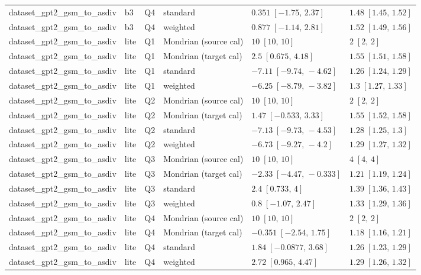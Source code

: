 \begin{longtable}{@{}p{}p{}p{}p{}p{}p{}@{}}
dataset\_gpt2\_gsm\_to\_asdiv & b3 & Q4 & standard & $0.351\;[-1.75,\,2.37]$ & $1.48\;[1.45,\,1.52]$ \\
dataset\_gpt2\_gsm\_to\_asdiv & b3 & Q4 & weighted & $0.877\;[-1.14,\,2.81]$ & $1.52\;[1.49,\,1.56]$ \\
dataset\_gpt2\_gsm\_to\_asdiv & lite & Q1 & Mondrian (source cal) & $10\;[10,\,10]$ & $2\;[2,\,2]$ \\
dataset\_gpt2\_gsm\_to\_asdiv & lite & Q1 & Mondrian (target cal) & $2.5\;[0.675,\,4.18]$ & $1.55\;[1.51,\,1.58]$ \\
dataset\_gpt2\_gsm\_to\_asdiv & lite & Q1 & standard & $-7.11\;[-9.74,\,-4.62]$ & $1.26\;[1.24,\,1.29]$ \\
dataset\_gpt2\_gsm\_to\_asdiv & lite & Q1 & weighted & $-6.25\;[-8.79,\,-3.82]$ & $1.3\;[1.27,\,1.33]$ \\
dataset\_gpt2\_gsm\_to\_asdiv & lite & Q2 & Mondrian (source cal) & $10\;[10,\,10]$ & $2\;[2,\,2]$ \\
dataset\_gpt2\_gsm\_to\_asdiv & lite & Q2 & Mondrian (target cal) & $1.47\;[-0.533,\,3.33]$ & $1.55\;[1.52,\,1.58]$ \\
dataset\_gpt2\_gsm\_to\_asdiv & lite & Q2 & standard & $-7.13\;[-9.73,\,-4.53]$ & $1.28\;[1.25,\,1.3]$ \\
dataset\_gpt2\_gsm\_to\_asdiv & lite & Q2 & weighted & $-6.73\;[-9.27,\,-4.2]$ & $1.29\;[1.27,\,1.32]$ \\
dataset\_gpt2\_gsm\_to\_asdiv & lite & Q3 & Mondrian (source cal) & $10\;[10,\,10]$ & $4\;[4,\,4]$ \\
dataset\_gpt2\_gsm\_to\_asdiv & lite & Q3 & Mondrian (target cal) & $-2.33\;[-4.47,\,-0.333]$ & $1.21\;[1.19,\,1.24]$ \\
dataset\_gpt2\_gsm\_to\_asdiv & lite & Q3 & standard & $2.4\;[0.733,\,4]$ & $1.39\;[1.36,\,1.43]$ \\
dataset\_gpt2\_gsm\_to\_asdiv & lite & Q3 & weighted & $0.8\;[-1.07,\,2.47]$ & $1.33\;[1.29,\,1.36]$ \\
dataset\_gpt2\_gsm\_to\_asdiv & lite & Q4 & Mondrian (source cal) & $10\;[10,\,10]$ & $2\;[2,\,2]$ \\
dataset\_gpt2\_gsm\_to\_asdiv & lite & Q4 & Mondrian (target cal) & $-0.351\;[-2.54,\,1.75]$ & $1.18\;[1.16,\,1.21]$ \\
dataset\_gpt2\_gsm\_to\_asdiv & lite & Q4 & standard & $1.84\;[-0.0877,\,3.68]$ & $1.26\;[1.23,\,1.29]$ \\
dataset\_gpt2\_gsm\_to\_asdiv & lite & Q4 & weighted & $2.72\;[0.965,\,4.47]$ & $1.29\;[1.26,\,1.32]$ \\

\end{longtable}
